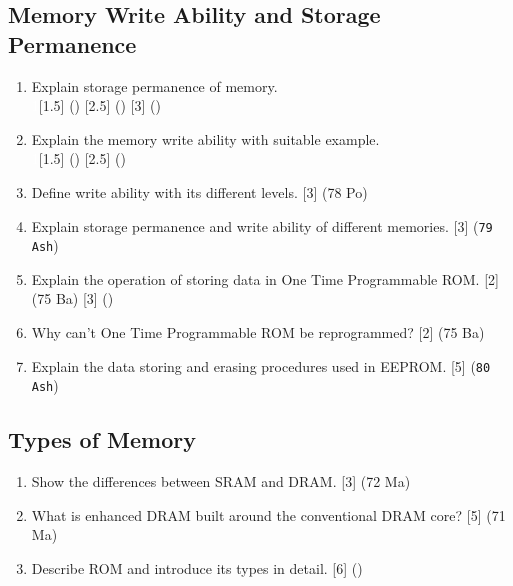 \documentclass[12pt]{article}
\newcommand{\enter}{\\\textcolor{white}{1}}
\begin{document}
  \subsection{Memory Write Ability and Storage Permanence}
    \begin{enumerate}
      \item Explain storage permanence of memory.
        \enter\hfill [1.5] () [2.5] () [3] ()

      \item Explain the memory write ability with suitable example.
        \enter\hfill [1.5] () [2.5] ()

      \item Define write ability with its different levels. \hfill [3] (78 Po)

      \item Explain storage permanence and write ability of different memories. \hfill [3] (\texttt{79 Ash})

      \item Explain the operation of storing data in One Time Programmable ROM. \hfill [2] (75 Ba) [3] ()

      \item Why can't One Time Programmable ROM be reprogrammed? \hfill [2] (75 Ba)

      \item Explain the data storing and erasing procedures used in EEPROM. \hfill [5] (\texttt{80 Ash})
    \end{enumerate}

  \subsection{Types of Memory}
    \begin{enumerate}
      \item Show the differences between SRAM and DRAM. \hfill [3] (72 Ma)

      \item What is enhanced DRAM built around the conventional DRAM core? \hfill [5] (71 Ma)

      \item Describe ROM and introduce its types in detail. \hfill [6] ()
    \end{enumerate}
\end{document}
